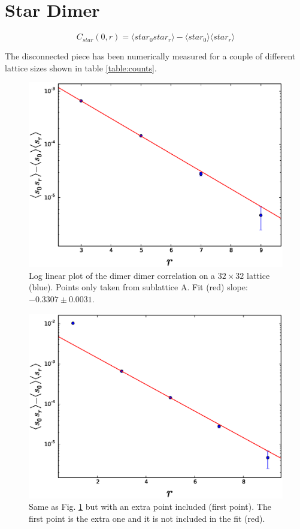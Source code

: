 \documentclass[aps,floatfix,11pt]{revtex4-1}
\begin{document}
\section{Star Dimer}

\begin{equation}
    \label{}
    C_{star}(0,r) =  \langle star_0 star_r \rangle -\langle star_0 \rangle \langle star_r \rangle
\end{equation}

\noindent
The disconnected piece has been numerically measured for a couple of different lattice sizes shown
in table \ref{table:counts}.

\begin{figure}[h]
    \centering
    \includegraphics[width=8.5 cm]{s_dimer_dimer_cor_loglin_one_sublat_A_32x32}
    \caption{Log linear plot of the dimer dimer correlation on a $32\times32$ lattice (blue). 
        Points only taken from sublattice A. Fit (red) slope: $-0.3307 \pm 0.0031$. 
    \label{fig:s_dimer_dimer_cor_loglin_one_sublat_A_32x32}}
\end{figure}

\begin{figure}[h]
    \centering
    \includegraphics[width=8.5 cm]{s_dimer_dimer_cor_loglin_one_sublat_A_32x32_extra_pnt}
    \caption{Same as Fig. \ref{fig:s_dimer_dimer_cor_loglin_one_sublat_A_32x32} but with an extra
        point included (first point). The first point is the extra one and 
        it is not included in the fit (red).
    \label{fig:s_dimer_dimer_cor_loglin_one_sublat_A_32x32_extra_pnt}}
\end{figure}
\end{document}
